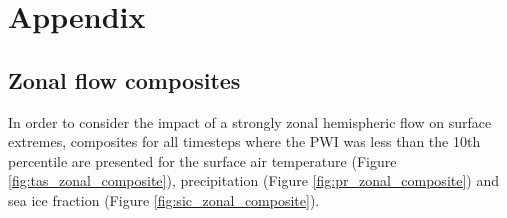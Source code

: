 \appendix*
\section*{Appendix}\label{s:appendix}

\subsection*{Zonal flow composites}\label{s:zonal_composites}

In order to consider the impact of a strongly zonal hemispheric flow on surface extremes, composites for all timesteps where the PWI was less than the 10th percentile are presented for the surface air temperature (Figure \ref{fig:tas_zonal_composite}), precipitation (Figure \ref{fig:pr_zonal_composite}) and sea ice fraction (Figure \ref{fig:sic_zonal_composite}).